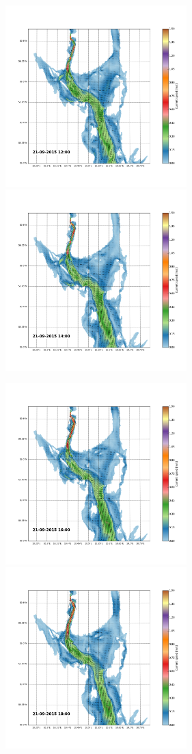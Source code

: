 \documentclass[12pt,a4paper,english]{article}
\begin{document}
\begin{figure}[h]
\centerline{
\includegraphics*[trim=2.0cm 3cm 6.0cm 3.5cm,clip=true,height=7cm]{Python/stromfelt_10}
\includegraphics*[trim=3.7cm 3cm 1.3cm 3.5cm,clip=true,height=7cm]{Python/stromfelt_12}
}
\centerline{
\includegraphics*[trim=2.0cm 3cm 6.0cm 3.5cm,clip=true,height=7cm]{Python/stromfelt_14}
\includegraphics*[trim=3.7cm 3cm 1.3cm 3.5cm,clip=true,height=7cm]{Python/stromfelt_16}
}
\end{figure}
\end{document}
